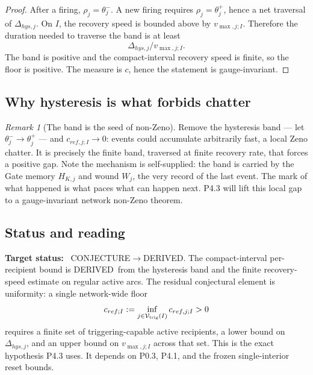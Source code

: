 \documentclass[11pt,a4paper]{article}
\def\mathfrak#1{#1}%
\def\mathrm#1{#1}%
\newcommand{\stDerived}{\textcolor{cDer}{\textsf{\small DERIVED}}}
\newcommand{\stConj}{\textcolor{cCon}{\textsf{\small CONJECTURE}}}
\theoremstyle{definition}
\theoremstyle{plain}
\theoremstyle{remark}
\newtheorem{remark}[definition]{Remark}
\begin{document}
\begin{proof}
After a firing, \(\rho_j=\theta_j^{-}\). A new firing requires
\(\rho_j=\theta_j^{+}\), hence a net traversal of
\(\Delta_{\mathrm{hys},j}\). On \(I\), the recovery speed is bounded above by
\(v_{\max,j;I}\). Therefore the duration needed to traverse the band is at least
\[
\Delta_{\mathrm{hys},j}/v_{\max,j;I}.
\]
The band is positive and the compact-interval recovery speed is finite, so the
floor is positive. The measure is \(\mathfrak c\), hence the statement is
gauge-invariant. \qedhere
\end{proof}

\subsection{Why hysteresis is what forbids chatter}

\begin{remark}[The band is the seed of non-Zeno]\label{rem:nonzeno-seed}
Remove the hysteresis band --- let \(\theta_j^{-}\to\theta_j^{+}\) --- and
\(\mathfrak c_{\mathrm{ref},j;I}\to0\): events could accumulate arbitrarily fast, a local Zeno
chatter. It is precisely the finite band, traversed at finite recovery rate, that forces a
positive gap. Note the mechanism is self-supplied: the band is carried by the Gate memory
\(H_{K,j}\) and wound \(W_j\), the very record of the last event. The mark of what happened
is what paces what can happen next. P4.3 will lift this local gap to a gauge-invariant
network non-Zeno theorem.
\end{remark}

\subsection{Status and reading}

\textbf{Target status:}~
\stConj\(\to\)\stDerived. The compact-interval per-recipient bound is
\stDerived\ from the hysteresis band and the finite recovery-speed estimate on
regular active arcs. The residual conjectural element is uniformity: a single
network-wide floor
\[
\mathfrak c_{\mathrm{ref};I}
:=
\inf_{j\in\mathcal V_{\rm trig}(I)}
\mathfrak c_{\mathrm{ref},j;I}>0
\]
requires a finite set of triggering-capable active recipients, a lower bound on
\(\Delta_{\mathrm{hys},j}\), and an upper bound on \(v_{\max,j;I}\) across that set.
This is the exact hypothesis P4.3 uses. It depends on P0.3, P4.1, and the frozen
single-interior reset bounds.
\end{document}
